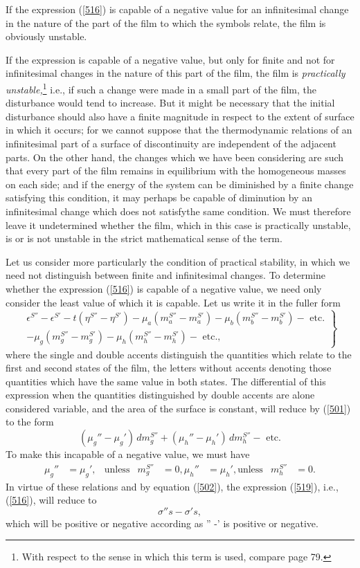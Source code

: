 \documentclass[12pt]{article}
\begin{document}
{If the expression (\ref{516}) is capable of a negative value for an infinitesimal change in the nature of the part of the film to which the symbols relate, the film is obviously unstable.

If the expression is capable of a negative value, but only for finite and not for infinitesimal changes in the nature of this part of the film, the film is \textit{practically unstable,}\footnote{With respect to the sense in which this term is used, compare page 79.} i.e., if such a change were made in a small part of the film, the disturbance would tend to increase. But it might be necessary that the initial disturbance should also have a finite magnitude in respect to the extent of surface in which it occurs; for we cannot suppose that the thermodynamic relations of an infinitesimal part of a surface of discontinuity are independent of the adjacent parts. On the other hand, the changes which we have been considering are such that every part of the film remains in equilibrium with the homogeneous masses on each side; and if the energy of the system can be diminished by a finite change satisfying this condition, it may perhaps be capable of diminution by an infinitesimal change which does not satisfythe same condition. We must therefore leave it undetermined whether the film, which in this case is practically unstable, is or is not unstable in the strict mathematical sense of the term.

Let us consider more particularly the condition of practical stability, in which we need not distinguish between finite and infinitesimal changes. To determine whether the expression (\ref{516}) is capable of a negative value, we need only consider the least value of which it is capable. Let us write it in the fuller form
\begin{equation} 
\left. \begin{array}{r} \epsilon^{S''}-\epsilon^{S'}- t(\eta^{S''}- \eta^{S'})-\mu_a(m_a^{S''}-m_a^{S'})-\mu_b(m_b^{S''}-m_b^{S'})-\text{ etc.}  \\
-\mu_g(m_g^{S''}-m_g^{S'})-\mu_h(m_h^{S''}-m_h^{S'}) - \text{ etc.}, \end{array} \right\} \label{519}\end{equation}
where the single and double accents distinguish the quantities which relate to the first and second states of the film, the letters without accents denoting those quantities which have the same value in both states. The differential of this expression when the quantities distinguished by double accents are alone considered variable, and the area of the surface is constant, will reduce by (\ref{501}) to the form
$$ (\mu_g''-\mu_g') \, d m_g^{S''}+(\mu_h''-\mu_h') \, d m_h^{S''}- \text{ etc.} $$
To make this incapable of a negative value, we must have
\begin{align*}
\mu_g'' &= \mu_g', & \text{unless} & m_g^{S''} &= 0,
\mu_h'' &= \mu_h', \text{unless} & m_h^{S''} &= 0. \end{align*}
In virtue of these relations and by equation (\ref{502}), the expression (\ref{519}), i.e., (\ref{516}), will reduce to
$$\sigma''s - \sigma's,$$
which will be positive or negative according as
\eqs \sigma'' -\sigma'  \label{520} \eqe
is positive or negative.

}
\end{document}
